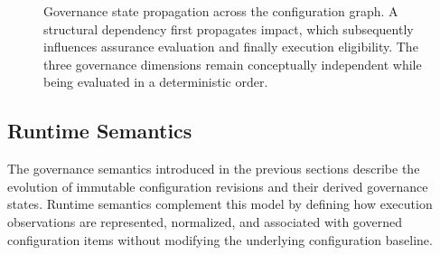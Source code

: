 \documentclass[10pt]{article}
\begin{document}
\begin{figure}[t]

\caption{Governance state propagation across the configuration graph.
A structural dependency first propagates impact, which subsequently influences
assurance evaluation and finally execution eligibility. The three governance
dimensions remain conceptually independent while being evaluated in a
deterministic order.}
\label{fig:governance_state_propagation}
\end{figure}

\subsection{Runtime Semantics}
\label{subsec:runtime_semantics}

The governance semantics introduced in the previous sections describe the
evolution of immutable configuration revisions and their derived governance
states. Runtime semantics complement this model by defining how execution
observations are represented, normalized, and associated with governed
configuration items without modifying the underlying configuration baseline.
\end{document}
